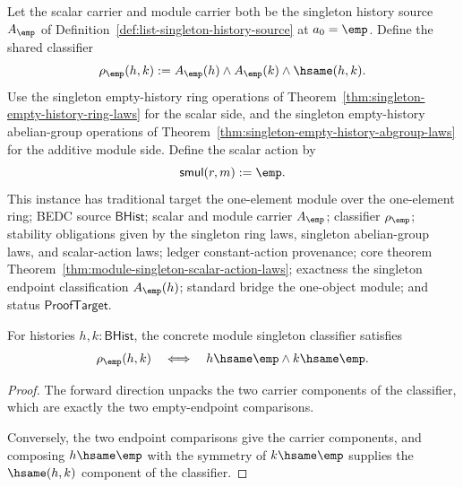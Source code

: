 \begin{definition}
\label{def:singleton-empty-history-module-instance}
Let the scalar carrier and module carrier both be the singleton history source
$A_{\emp}$ of Definition~\ref{def:list-singleton-history-source} at
$a_0=\emp$. Define the shared classifier
$$
\rho_{\emp}(h,k):=
A_{\emp}(h)\land A_{\emp}(k)\land\hsame(h,k).
$$
Use the singleton empty-history ring operations of
Theorem~\ref{thm:singleton-empty-history-ring-laws} for the scalar side, and
the singleton empty-history abelian-group operations of
Theorem~\ref{thm:singleton-empty-history-abgroup-laws} for the additive module
side. Define the scalar action by
$$
\mathsf{smul}(r,m):=\emp.
$$
This instance has traditional target the one-element module over the
one-element ring; BEDC source $\mathsf{BHist}$; scalar and module carrier
$A_{\emp}$; classifier $\rho_{\emp}$; stability obligations given by the
singleton ring laws, singleton abelian-group laws, and scalar-action laws;
ledger constant-action provenance; core theorem
Theorem~\ref{thm:module-singleton-scalar-action-laws}; exactness the singleton
endpoint classification $A_{\emp}(h)$; standard bridge the one-object module;
and status $\mathsf{ProofTarget}$.
\end{definition}

\begin{theorem}
\label{thm:module-singleton-classifier-empty-endpoints}
For histories $h,k:\mathsf{BHist}$, the concrete module singleton classifier
satisfies
$$
\rho_{\emp}(h,k)
\quad\Longleftrightarrow\quad
h\hsame\emp\land k\hsame\emp.
$$
\end{theorem}
\begin{proof}
The forward direction unpacks the two carrier components of the classifier,
which are exactly the two empty-endpoint comparisons.

Conversely, the two endpoint comparisons give the carrier components, and
composing $h\hsame\emp$ with the symmetry of $k\hsame\emp$ supplies the
$\hsame(h,k)$ component of the classifier.
\end{proof}

